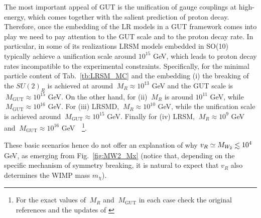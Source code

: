 \documentclass[11pt]{article}
\newcommand{\MG}{\:M_{\text{GUT}}}
\newcommand{\MR}{\:M_{R}}
\newcommand{\Tabref}[1]{Tab.~\ref{#1}}
\newcommand{\lsim}{\mathrel{\mathop{\kern 0pt \rlap
      {\raise.2ex\hbox{$<$}}}\lower.9ex\hbox{\kern-.190em $ \sim$}}}
\begin{document}
The most important appeal of GUT is the unification of gauge couplings at high-energy, which comes together with the salient prediction of proton decay. Therefore, once the embedding of the LR models in a GUT framework comes into play we need to pay attention to the GUT scale and to the proton decay rate.  In particular, in some of its realizations LRSM models embedded in SO(10) typically achieve a unification scale around $10^{15}$ GeV, which leads to proton decay rates incompatible to the experimental constraints. Specifically, for the minimal particle content of \Tabref{tb:LRSM_MC} and the embedding (i) the breaking of the $SU(2)_R$ is achieved at around $\MR\approx 10^{13}$ GeV and the GUT scale is
$\MG\approx 10^{15}$ GeV. On the other hand, for (ii) $\MR$ is around $10^{11}$ GeV, while $\MG\approx 10^{16}$ GeV. For (iii) LRSMD,  $\MR\approx 10^{10}$ GeV, while the unification scale is achieved around $\MG \approx 10^{15}$ GeV. Finally for (iv) {\rm LRSM}, $\MR \approx 10^9$ GeV and $\MG \approx 10^{16}$ GeV~\cite{Shaban:1992he}~\footnote{For the exact values of $\MR$ and $\MG$ in each case check the original references and the updates of \cite{Mambrini:2015vna,Chakrabortty:2017mgi}}. 

These basic scenarios hence do not offer an explanation of why $v_R\simeq M_{W_2} \lsim 10^{4}$ GeV, as emerging from Fig.~\ref{fig:MW2_Mx} (notice that, depending on the specific mechanism of symmetry breaking, it is natural to expect that $v_R$ also determines the WIMP mass $m_\chi$).
\end{document}
